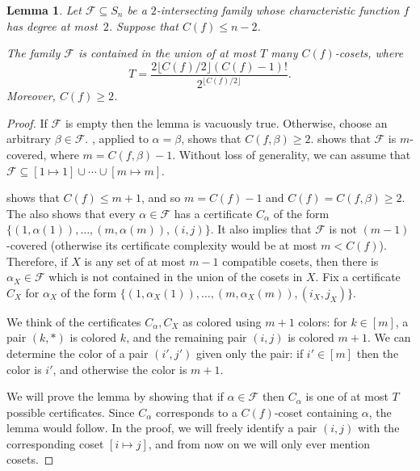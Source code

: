\documentclass{article}
\newtheorem{lemma}[theorem]{Lemma}
\theoremstyle{definition}
\providecommand{\coset}[2]{[#1 \mapsto #2]}
\begin{document}
\begin{lemma} \label{lem:main-ub-sym}
Let $\mathcal{F} \subseteq S_n$ be a $2$-intersecting family whose characteristic function $f$ has degree at most~$2$. Suppose that $C(f) \leq n-2$.

The family $\mathcal{F}$ is contained in the union of at most $T$ many $C(f)$-cosets, where
\[
 T = \frac{2\lfloor C(f)/2 \rfloor (C(f) - 1)!}{2^{\lfloor C(f)/2 \rfloor}}.
\]
Moreover, $C(f) \geq 2$.
\end{lemma}
\begin{proof}
If $\mathcal{F}$ is empty then the lemma is vacuously true. Otherwise, choose an arbitrary $\beta \in \mathcal{F}$. , applied to $\alpha = \beta$, shows that $C(f,\beta) \geq 2$.  shows that $\mathcal{F}$ is $m$-covered, where $m = C(f,\beta) - 1$. Without loss of generality, we can assume that $\mathcal{F} \subseteq \coset{1}{1} \cup \cdots \cup \coset{m}{m}$.

 shows that $C(f) \leq m + 1$, and so $m = C(f) - 1$ and $C(f) = C(f,\beta) \geq 2$. The  also shows that every $\alpha \in \mathcal{F}$ has a certificate $C_\alpha$ of the form $\{(1,\alpha(1)),\ldots,(m,\alpha(m)),(i,j)\}$.
It also implies that $\mathcal{F}$ is not $(m-1)$-covered (otherwise its certificate complexity would be at most $m < C(f)$). Therefore, if $X$ is any set of at most $m-1$ compatible cosets, then there is $\alpha_X \in \mathcal{F}$ which is not contained in the union of the cosets in $X$. Fix a certificate $C_X$ for $\alpha_X$ of the form $\{(1,\alpha_X(1)),\ldots,(m,\alpha_X(m)),(i_X,j_X)\}$.

We think of the certificates $C_\alpha,C_X$ as colored using $m + 1$ colors: for $k \in [m]$, a pair $(k,\ast)$ is colored $k$, and the remaining pair $(i,j)$ is colored $m+1$. We can determine the color of a pair $(i',j')$ given only the pair: if $i' \in [m]$ then the color is $i'$, and otherwise the color is $m+1$.

We will prove the lemma by showing that if $\alpha \in \mathcal{F}$ then $C_\alpha$ is one of at most $T$ possible certificates. Since $C_\alpha$ corresponds to a $C(f)$-coset containing $\alpha$, the lemma would follow.
In the proof, we will freely identify a pair $(i,j)$ with the corresponding coset $\coset{i}{j}$, and from now on we will only ever mention cosets.

\smallskip


\end{proof}
\end{document}
